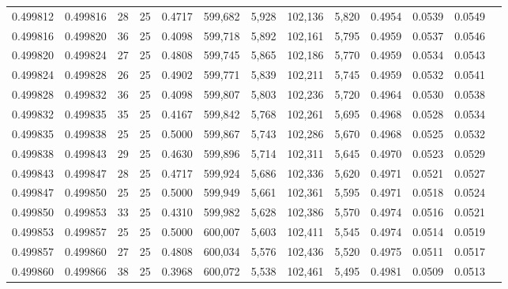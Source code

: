 \begin{tabular}{rrrrrrrrrrrrr}
0.499812 & 0.499816 &    28 &  25 &                                     0.4717 & 599,682 &   5,928 & 102,136 &   5,820 & 0.4954 & 0.0539 & 0.0549 \\
0.499816 & 0.499820 &    36 &  25 &                                     0.4098 & 599,718 &   5,892 & 102,161 &   5,795 & 0.4959 & 0.0537 & 0.0546 \\
0.499820 & 0.499824 &    27 &  25 &                                     0.4808 & 599,745 &   5,865 & 102,186 &   5,770 & 0.4959 & 0.0534 & 0.0543 \\
0.499824 & 0.499828 &    26 &  25 &                                     0.4902 & 599,771 &   5,839 & 102,211 &   5,745 & 0.4959 & 0.0532 & 0.0541 \\
0.499828 & 0.499832 &    36 &  25 &                                     0.4098 & 599,807 &   5,803 & 102,236 &   5,720 & 0.4964 & 0.0530 & 0.0538 \\
0.499832 & 0.499835 &    35 &  25 &                                     0.4167 & 599,842 &   5,768 & 102,261 &   5,695 & 0.4968 & 0.0528 & 0.0534 \\
0.499835 & 0.499838 &    25 &  25 &                                     0.5000 & 599,867 &   5,743 & 102,286 &   5,670 & 0.4968 & 0.0525 & 0.0532 \\
0.499838 & 0.499843 &    29 &  25 &                                     0.4630 & 599,896 &   5,714 & 102,311 &   5,645 & 0.4970 & 0.0523 & 0.0529 \\
0.499843 & 0.499847 &    28 &  25 &                                     0.4717 & 599,924 &   5,686 & 102,336 &   5,620 & 0.4971 & 0.0521 & 0.0527 \\
0.499847 & 0.499850 &    25 &  25 &                                     0.5000 & 599,949 &   5,661 & 102,361 &   5,595 & 0.4971 & 0.0518 & 0.0524 \\
0.499850 & 0.499853 &    33 &  25 &                                     0.4310 & 599,982 &   5,628 & 102,386 &   5,570 & 0.4974 & 0.0516 & 0.0521 \\
0.499853 & 0.499857 &    25 &  25 &                                     0.5000 & 600,007 &   5,603 & 102,411 &   5,545 & 0.4974 & 0.0514 & 0.0519 \\
0.499857 & 0.499860 &    27 &  25 &                                     0.4808 & 600,034 &   5,576 & 102,436 &   5,520 & 0.4975 & 0.0511 & 0.0517 \\
0.499860 & 0.499866 &    38 &  25 &                                     0.3968 & 600,072 &   5,538 & 102,461 &   5,495 & 0.4981 & 0.0509 & 0.0513 \\

\end{tabular}
